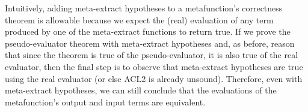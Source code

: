 Intuitively, adding meta-extract hypotheses to a metafunction's
correctness theorem is allowable because we expect the (real)
evaluation of any term produced by one of the meta-extract functions
to return true.  If we prove the pseudo-evaluator theorem with
meta-extract hypotheses and, as before, reason that since the theorem
is true of the pseudo-evaluator, it is also true of the real
evaluator, then the final step is to observe that meta-extract
hypotheses are true using the real evaluator (or else ACL2 is already
unsound).  Therefore, even with meta-extract hypotheses, we can still
conclude that the evaluations of the metafunction's output and input
terms are equivalent.
